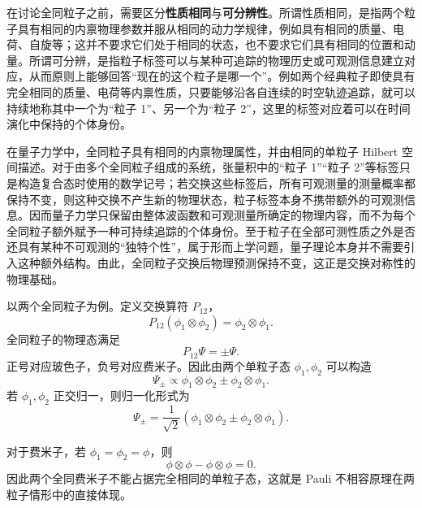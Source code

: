 \documentclass[UTF8,a4paper,11pt,openany]{ctexbook}
\begin{document}
在讨论全同粒子之前，需要区分\textbf{性质相同}与\textbf{可分辨性}。所谓性质相同，是指两个粒子具有相同的内禀物理参数并服从相同的动力学规律，例如具有相同的质量、电荷、自旋等；这并不要求它们处于相同的状态，也不要求它们具有相同的位置和动量。所谓可分辨，是指粒子标签可以与某种可追踪的物理历史或可观测信息建立对应，从而原则上能够回答“现在的这个粒子是哪一个”。例如两个经典粒子即使具有完全相同的质量、电荷等内禀性质，只要能够沿各自连续的时空轨迹追踪，就可以持续地称其中一个为“粒子 1”、另一个为“粒子 2”，这里的标签对应着可以在时间演化中保持的个体身份。

在量子力学中，全同粒子具有相同的内禀物理属性，并由相同的单粒子 Hilbert 空间描述。对于由多个全同粒子组成的系统，张量积中的“粒子 1”“粒子 2”等标签只是构造复合态时使用的数学记号；若交换这些标签后，所有可观测量的测量概率都保持不变，则这种交换不产生新的物理状态，粒子标签本身不携带额外的可观测信息。因而量子力学只保留由整体波函数和可观测量所确定的物理内容，而不为每个全同粒子额外赋予一种可持续追踪的个体身份。至于粒子在全部可测性质之外是否还具有某种不可观测的“独特个性”，属于形而上学问题，量子理论本身并不需要引入这种额外结构。由此，全同粒子交换后物理预测保持不变，这正是交换对称性的物理基础。

以两个全同粒子为例。定义交换算符 $P_{12}$，
\begin{equation}
    P_{12}
    (\phi_1\otimes\phi_2)
    =
    \phi_2\otimes\phi_1.
\end{equation}
全同粒子的物理态满足
\begin{equation}
    P_{12}\Psi
    =
    \pm\Psi.
\end{equation}
正号对应玻色子，负号对应费米子。因此由两个单粒子态
$\phi_1,\phi_2$ 可以构造
\begin{equation}
    \Psi_\pm
    \propto
    \phi_1\otimes\phi_2
    \pm
    \phi_2\otimes\phi_1.
\end{equation}
若 $\phi_1,\phi_2$ 正交归一，则归一化形式为
\begin{equation}
    \Psi_\pm
    =
    \frac{1}{\sqrt2}
    \left(
        \phi_1\otimes\phi_2
        \pm
        \phi_2\otimes\phi_1
    \right).
\end{equation}

对于费米子，若
$\phi_1=\phi_2=\phi$，则
\begin{equation}
    \phi\otimes\phi
    -
    \phi\otimes\phi
    =
    0.
\end{equation}
因此两个全同费米子不能占据完全相同的单粒子态，这就是 Pauli 不相容原理在两粒子情形中的直接体现。
\end{document}

